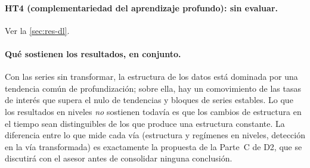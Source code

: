 \paragraph{HT4 (complementariedad del aprendizaje profundo): sin evaluar.} Ver la
\cref{sec:res-dl}.

\paragraph{Qué sostienen los resultados, en conjunto.} Con las series sin transformar, la
estructura de los datos está dominada por una tendencia común de profundización; sobre ella, hay un
comovimiento de las tasas de interés que supera el nulo de tendencias y \clasesHfcMenor{} bloques de series
estables. Lo que los resultados en niveles \emph{no} sostienen todavía es que los cambios de
estructura en el tiempo sean distinguibles de los que produce una estructura constante. La
diferencia entre lo que mide cada vía (estructura y regímenes en niveles, detección en la vía
transformada) es exactamente la propuesta de la Parte~C de D2, que se discutirá con el asesor
antes de consolidar ninguna conclusión.
